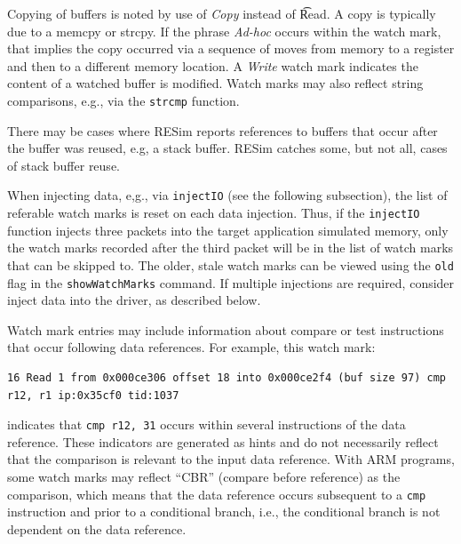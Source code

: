 \documentclass[titlepage]{article}
\begin{document}
Copying of buffers is noted by use of \textit{Copy} instead of \t{Read}.  A copy is typically due to a memcpy or strcpy.  If the phrase \textit{Ad-hoc} occurs
within the watch mark, that implies the copy occurred via a sequence of moves from memory to a register and then to a different memory location.
A \textit{Write} watch mark indicates the content of a watched buffer is modified.  Watch marks may also reflect string comparisons, e.g., via the {\tt strcmp}
function.

There may be cases where RESim reports references to buffers that occur after the buffer was reused, e.g, a stack buffer.  RESim catches some, but not all,
cases of stack buffer reuse.

When injecting data, e,g., via {\tt injectIO} (see the following subsection), the list of referable watch marks is reset on each data injection.  Thus, if the {\tt injectIO} function injects
three packets into the target application simulated memory, only the watch marks recorded after the third packet will be in 
the list of watch marks that can be skipped to.  The older, stale watch marks can
be viewed using the {\tt old} flag in the {\tt showWatchMarks} command.  If multiple injections are required, consider inject data into the driver, as described below.

Watch mark entries may include information about compare or test instructions that occur following data references.  For example, this watch mark:

\begin{verbatim}
16 Read 1 from 0x000ce306 offset 18 into 0x000ce2f4 (buf size 97) cmp r12, r1 ip:0x35cf0 tid:1037
\end{verbatim}
\noindent indicates that {\tt cmp r12, 31} occurs within several instructions of the data reference.  These indicators are generated as hints and do not necessarily reflect
that the comparison is relevant to the input data reference.  With ARM programs, some watch marks may reflect ``CBR'' (compare before reference) as the comparison, 
which means that the data reference occurs subsequent to a {\tt cmp} instruction and prior to a conditional branch, i.e., the conditional branch is not dependent on the data reference.
\end{document}

